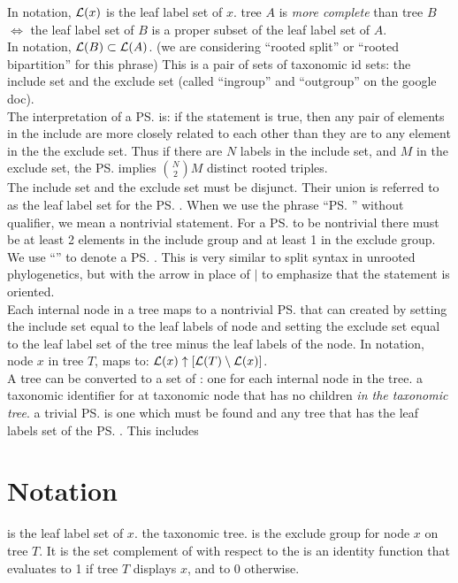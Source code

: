\begin{compactenum}
    In notation, $\mathcal{L}(x)$ is the leaf label set of $x$.
 tree $A$ is {\em more complete} than tree $B$ $\iff$ the leaf
    label set of $B$ is a proper subset of the leaf label set of $A$. \\
    In notation, $\mathcal{L}(B) \subset \mathcal{L}(A)$.
 (we are considering ``rooted split'' or ``rooted bipartition'' for this phrase)
    This is a pair of sets of taxonomic id sets: the include set and the exclude set (called ``ingroup'' and ``outgroup''
    on the google doc).\\
    The interpretation of a \ps is: if the statement is true, then 
    any pair of elements in the include are more closely related to each
        other than they are to any element in the the exclude set.
    Thus if there are $N$ labels in the include set, and $M$ in the exclude set, the \ps implies
    ${N \choose 2}M$ distinct rooted triples.\\
    The include set and the exclude set must be disjunct. Their union is referred to as the leaf label set
        for the \ps.
    When we use the phrase ``\ps'' without qualifier, we mean a nontrivial statement.
    For a \ps to be nontrivial there must be at least 2 elements in the include group and at least 
        1 in the exclude group.\\
    We use ``'' to denote a \ps. 
    This is very similar to split syntax in unrooted phylogenetics, but with the arrow 
        in place of $\mid$ to emphasize that the statement is oriented.\\
    Each internal node in a tree maps to a nontrivial \ps that can created by setting
        the include set equal to the leaf labels of node and setting the exclude set equal
        to the leaf label set of the tree minus the leaf labels of the node.
        In notation, node $x$ in tree $T$, maps to: $\mathcal{L}(x)\uparrow{[\ensuremath{\mathcal{L}(T)} \setminus \ensuremath{\mathcal{L}(x)}]}$.\\
    A tree can be converted to a set of \pss: one for each internal node in the tree.
 a taxonomic identifier for at taxonomic node that
    has no children {\em in the taxonomic tree}.
 a trivial \ps is one which must be found and any tree that has
    the leaf labels set of the \ps.
    This includes

\end{compactenum}
\section{Notation}
\begin{compactenum}
     is the leaf label set of $x$.
    \notitem{\taxonomy} the taxonomic tree.
     is the exclude group for node $x$ on tree $T$. It is the 
        set complement of  with respect to the 
     is an identity function that evaluates to 1 if tree $T$
        displays $x$, and to 0 otherwise.
\end{compactenum}
